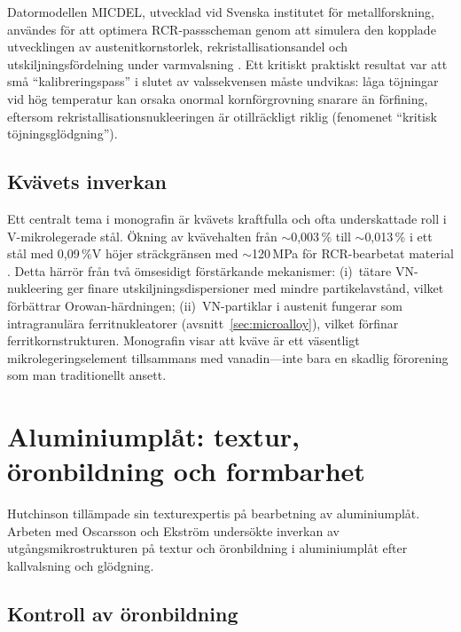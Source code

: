 \documentclass[11pt,a4paper]{article}
\begin{document}
Datormodellen MICDEL, utvecklad vid Svenska institutet f\"or
metallforskning, anv\"andes f\"or att optimera RCR-passscheman genom att
simulera den kopplade utvecklingen av austenitkornstorlek,
rekristallisationsandel och utskiljningsf\"ordelning under varmvalsning
\cite{Siwecki1992}.  Ett kritiskt praktiskt resultat var att sm\aa{}
``kalibreringspass'' i slutet av valssekvensen m\aa{}ste undvikas: l\aa{}ga
t\"ojningar vid h\"og temperatur kan orsaka onormal kornf\"orgrovning
snarare \"an f\"orfining, eftersom rekristallisationsnukleeringen \"ar
otillr\"ackligt riklig (fenomenet ``kritisk t\"ojningsgl\"odgning'').

\subsection{Kv\"avets inverkan}

Ett centralt tema i monografin \"ar kv\"avets kraftfulla och ofta
underskattade roll i V-mikrolegerade st\aa{}l.  \"Okning av kv\"avehalten
fr\aa{}n $\sim$0,003\,\% till $\sim$0,013\,\% i ett st\aa{}l med
0,09\,\%V h\"ojer str\"ackgr\"ansen med $\sim$120\,MPa f\"or
RCR-bearbetat material \cite{Zajac1991}.  Detta h\"arr\"or fr\aa{}n tv\aa{}
\"omsesidigt f\"orst\"arkande mekanismer: (i)~t\"atare VN-nukleering
ger finare utskiljningsdispersioner med mindre partikelavst\aa{}nd, vilket
f\"orb\"attrar Orowan-h\"ardningen; (ii)~VN-partiklar i austenit
fungerar som intragranul\"ara ferritnukleatorer
(avsnitt~\ref{sec:microalloy}), vilket f\"orfinar ferritkornstrukturen.
Monografin visar att kv\"ave \"ar ett v\"asentligt mikrolegeringselement
tillsammans med vanadin---inte bara en skadlig f\"ororening som man
traditionellt ansett.

\section{Aluminiumpl\aa{}t: textur, \"oronbildning och formbarhet}
\label{sec:aluminium}

Hutchinson till\"ampade sin texturexpertis p\aa{} bearbetning av
aluminiumpl\aa{}t.  Arbeten med Oscarsson och Ekstr\"om
\cite{Oscarsson1991} unders\"okte inverkan av utg\aa{}ngsmikrostrukturen
p\aa{} textur och \"oronbildning i aluminiumpl\aa{}t efter kallvalsning
och gl\"odgning.

\subsection{Kontroll av \"oronbildning}
\end{document}
